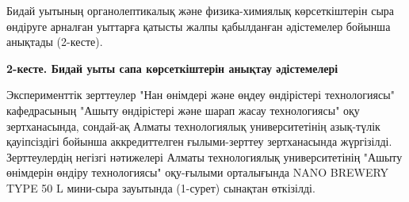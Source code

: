 Бидай уытының органолептикалық және физика-химиялық көрсеткіштерін сыра
өндіруге арналған уыттарға қатысты жалпы қабылданған әдістемелер бойынша
анықтады (2-кесте).

{\bfseries 2-кесте. Бидай уыты сапа көрсеткіштерін анықтау әдістемелері}


Эксперименттік зерттеулер "Нан өнімдері және өңдеу өндірістері
технологиясы" кафедрасының "Ашыту өндірістері және шарап жасау
технологиясы" оқу зертханасында, сондай-ақ Алматы технологиялық
университетінің азық-түлік қауіпсіздігі бойынша аккредиттелген
ғылыми-зерттеу зертханасында жүргізілді. Зерттеулердің негізгі
нәтижелері Алматы технологиялық университетінің "Ашыту өнімдерін өндіру
технологиясы" оқу-ғылыми орталығында NANO BREWERY TYPE 50 L мини-сыра
зауытында (1-сурет) сынақтан өткізілді.

